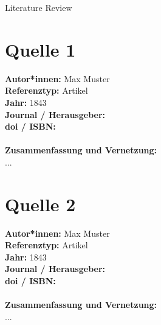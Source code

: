 \documentclass{report}
\begin{document}
{\LARGE Literature Review}


{\let\clearpage\relax \chapter{Quelle 1}}
\noindent
\textbf{Autor*innen:} Max Muster\\
\textbf{Referenztyp:} Artikel\\
\textbf{Jahr:} 1843\\
\textbf{Journal / Herausgeber:}\\
\textbf{doi / ISBN:}\\\\
\textbf{Zusammenfassung und Vernetzung:}\\
...\\


{\let\clearpage\relax \chapter{Quelle 2}}
\noindent
\textbf{Autor*innen:} Max Muster\\
\textbf{Referenztyp:} Artikel\\
\textbf{Jahr:} 1843\\
\textbf{Journal / Herausgeber:}\\
\textbf{doi / ISBN:}\\\\
\textbf{Zusammenfassung und Vernetzung:}\\
...\\
\end{document}
